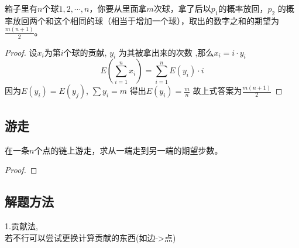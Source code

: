 \begin{proposition}
  箱子里有$n$个球$1,2,⋯,n$，你要从里面拿$m$次球，拿了后以$p_1$的概率放回，$p_2$
  的概率放回两个和这个相同的球（相当于增加一个球），取出的数字之和的期望为 $\frac{m(n+1)}{2}$。
\end{proposition}

\begin{proof}
  设$x_i$为第$i$个球的贡献, $y_i$ 为其被拿出来的次数 ,那么$x_i=i\cdot y_i$
  $$
  E\left(\sum_{i=1}^{n}x_i\right)=\sum_{i=1}^{n}E(y_i)\cdot i
  $$
  因为$E(y_i)=E(y_j)$, $\sum y_i =m$ 得出$E(y_i)=\frac{m}{n}$
  故上式答案为$\frac{m(n+1)}{2}$
\end{proof}

\subsection{游走}
\begin{proposition}
  在一条$n$个点的链上游走，求从一端走到另一端的期望步数。
\end{proposition}

\begin{proof}
  
\end{proof}

\subsection{解题方法}
1.贡献法,\\
若不行可以尝试更换计算贡献的东西(如边->点)\\